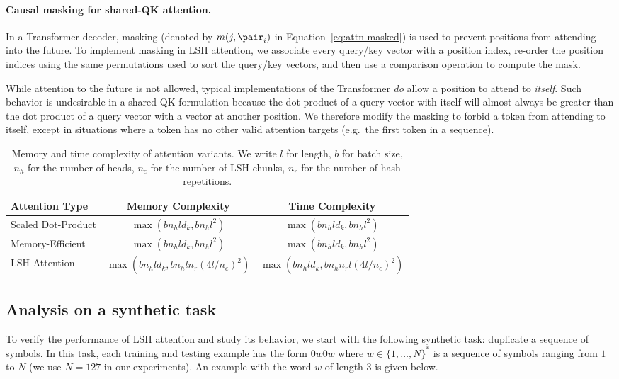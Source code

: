 \paragraph{Causal masking for shared-QK attention.}
In a Transformer decoder, masking (denoted by $m(j, \pair_i)$ in Equation~\ref{eq:attn-masked}) is used to prevent positions from attending into the future. To implement masking in LSH attention, we associate every query/key vector with a position index, re-order the position indices using the same permutations used to sort the query/key vectors, and then use a comparison operation to compute the mask.

While attention to the future is not allowed, typical implementations of the Transformer \emph{do} allow a position to attend to \emph{itself}. Such behavior is undesirable in a shared-QK formulation because the dot-product of a query vector with itself will almost always be greater than the dot product of a query vector with a vector at another position. We therefore modify the masking to forbid a token from attending to itself, except in situations where a token has no other valid attention targets (e.g.\ the first token in a sequence).

\begin{table}
\caption{Memory and time complexity of attention variants.
  We write $l$ for length, $b$ for batch size, $n_h$ for the number of heads,
  $n_c$ for the number of LSH chunks, $n_r$ for the number of hash repetitions.}
\label{tab:complexity}
\begin{center}
\begin{tabular}{lcc}
Attention Type & Memory Complexity & Time Complexity  \\
\hline
Scaled Dot-Product & $\max(bn_hld_k, bn_hl^2)$ & $\max(bn_hld_k, bn_hl^2)$ \\
Memory-Efficient & $\max(bn_hld_k, bn_hl^2)$ & $\max(bn_hld_k, bn_hl^2)$ \\
LSH Attention & $\max(bn_hld_k, bn_hln_r(4l/n_c)^2)$ & $\max(bn_hld_k, bn_hn_rl(4l/n_c)^2)$ \\
\end{tabular}
\end{center}
\end{table}

\subsection{Analysis on a synthetic task}

To verify the performance of LSH attention and study its behavior,
we start with the following synthetic task: duplicate a sequence
of symbols. In this task, each training and testing example has
the form $0w0w$ where $w \in \{1, \dots, N\}^*$ is a sequence of
symbols ranging from $1$ to $N$ (we use $N = 127$ in our experiments).
An example with the word $w$ of length $3$ is given below.

